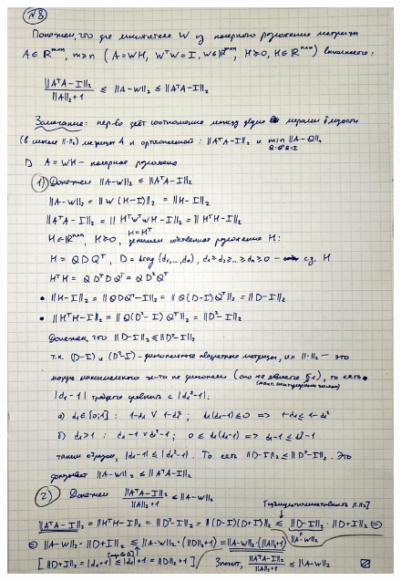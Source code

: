 \documentclass{article}
\begin{document}
		\begin{figure}[h!]
			\includegraphics[width=0.95\linewidth]{handwritten/matcomp_hw1_8}
		\end{figure}
		
		\FloatBarrier 
\end{document}
